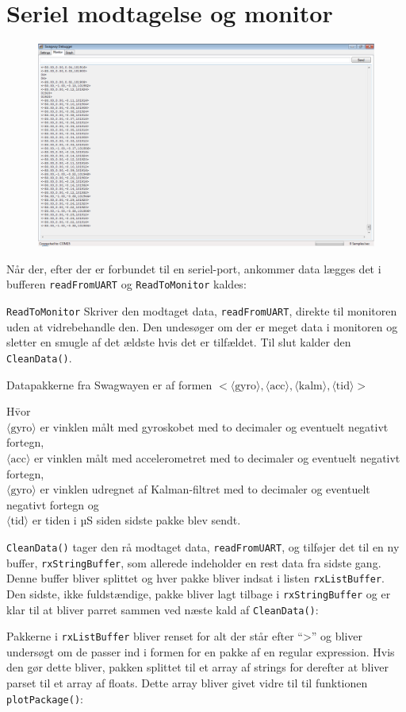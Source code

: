 \documentclass[a4paper,oneside,article,danish,table]{memoir}
\newcommand{\form}[2]{}
\begin{document}
\section{Seriel modtagelse og monitor}
\begin{figure}[htbp]
  \centering
  \includegraphics[width=1\textwidth]{monitor.png}
\end{figure}
Når der, efter der er forbundet til en seriel-port, ankommer data lægges det i bufferen \texttt{readFromUART} og \texttt{ReadToMonitor} kaldes:
\form{131}{136}
\texttt{ReadToMonitor} Skriver den modtaget data, \texttt{readFromUART}, direkte til monitoren uden at vidrebehandle den. Den undesøger om der er meget data i monitoren og sletter en smugle af det ældste hvis det er tilfældet. Til slut kalder den \texttt{CleanData()}.
\form{138}{149}
Datapakkerne fra Swagwayen er af formen $<\langle \text{gyro} \rangle,\langle \text{acc} \rangle,\langle \text{kalm} \rangle,\langle \text{tid} \rangle>$
\begin{tabbing}
H\=vor\\
\> $\langle \text{gyro} \rangle$ er vinklen målt med gyroskobet med to decimaler og eventuelt negativt fortegn,\\
\> $\langle \text{acc} \rangle$ er vinklen målt med accelerometret med to decimaler og eventuelt negativt fortegn,\\
\> $\langle \text{gyro} \rangle$ er vinklen udregnet af Kalman-filtret  med to decimaler og eventuelt negativt fortegn og\\
\> $\langle \text{tid} \rangle$ er tiden i µS siden sidste pakke blev sendt.
\end{tabbing}
\texttt{CleanData()} tager den rå modtaget data, \texttt{readFromUART}, og tilføjer det til en ny buffer, \texttt{rxStringBuffer}, som allerede indeholder en rest data fra sidste gang. Denne buffer bliver splittet og hver pakke bliver indsat i listen \texttt{rxListBuffer}. Den sidste, ikke fuldstændige, pakke bliver lagt tilbage i \texttt{rxStringBuffer} og er klar til at bliver parret sammen ved næste kald af \texttt{CleanData()}:
\form{151}{157}
Pakkerne i \texttt{rxListBuffer} bliver renset for alt der står efter “>” og bliver undersøgt om de passer ind i formen for en pakke af en regular expression. Hvis den gør dette bliver, pakken splittet til et array af strings for derefter at bliver parset til et array af floats. Dette array bliver givet vidre til til funktionen \texttt{plotPackage()}:
\form{159}{189}
\end{document}
